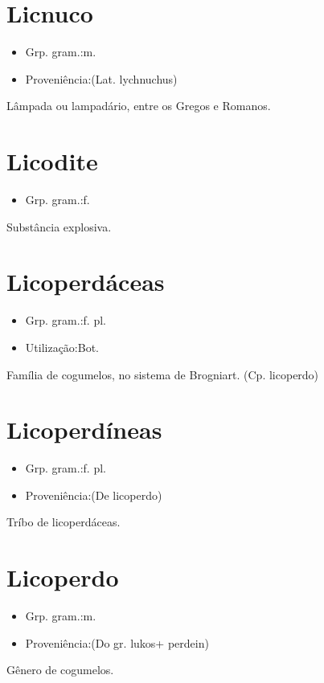 \section{Licnuco}
\begin{itemize}
\item {Grp. gram.:m.}
\end{itemize}
\begin{itemize}
\item {Proveniência:(Lat. \textunderscore lychnuchus\textunderscore )}
\end{itemize}
Lâmpada ou lampadário, entre os Gregos e Romanos.
\section{Licodite}
\begin{itemize}
\item {Grp. gram.:f.}
\end{itemize}
Substância explosiva.
\section{Licoperdáceas}
\begin{itemize}
\item {Grp. gram.:f. pl.}
\end{itemize}
\begin{itemize}
\item {Utilização:Bot.}
\end{itemize}
Família de cogumelos, no sistema de Brogniart.
(Cp. \textunderscore licoperdo\textunderscore )
\section{Licoperdíneas}
\begin{itemize}
\item {Grp. gram.:f. pl.}
\end{itemize}
\begin{itemize}
\item {Proveniência:(De \textunderscore licoperdo\textunderscore )}
\end{itemize}
Tríbo de licoperdáceas.
\section{Licoperdo}
\begin{itemize}
\item {Grp. gram.:m.}
\end{itemize}
\begin{itemize}
\item {Proveniência:(Do gr. \textunderscore lukos\textunderscore  + \textunderscore perdein\textunderscore )}
\end{itemize}
Gênero de cogumelos.
